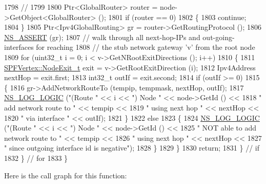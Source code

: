 \begin{DoxyCode}
1798 \textcolor{comment}{//}
1799 
1800           Ptr<GlobalRouter> router = node->GetObject<GlobalRouter> ();
1801           \textcolor{keywordflow}{if} (router == 0)
1802             \{
1803               \textcolor{keywordflow}{continue};
1804             \}
1805           Ptr<Ipv4GlobalRouting> gr = router->GetRoutingProtocol ();
1806           \hyperlink{assert_8h_a6dccdb0de9b252f60088ce281c49d052}{NS\_ASSERT} (gr);
1807           \textcolor{comment}{// walk through all next-hop-IPs and out-going-interfaces for reaching}
1808           \textcolor{comment}{// the stub network gateway 'v' from the root node}
1809           \textcolor{keywordflow}{for} (uint32\_t i = 0; i < v->GetNRootExitDirections (); i++)
1810             \{
1811               \hyperlink{classns3_1_1SPFVertex_a0adf6255ec0357050ef5436597b4cb32}{SPFVertex::NodeExit\_t} exit = v->GetRootExitDirection (i);
1812               Ipv4Address nextHop = exit.first;
1813               int32\_t outIf = exit.second;
1814               \textcolor{keywordflow}{if} (outIf >= 0)
1815                 \{
1816                   gr->AddNetworkRouteTo (tempip, tempmask, nextHop, outIf);
1817                   \hyperlink{group__logging_ga88acd260151caf2db9c0fc84997f45ce}{NS\_LOG\_LOGIC} (\textcolor{stringliteral}{"(Route "} << i << \textcolor{stringliteral}{") Node "} << node->GetId () <<
1818                                 \textcolor{stringliteral}{" add network route to "} << tempip <<
1819                                 \textcolor{stringliteral}{" using next hop "} << nextHop <<
1820                                 \textcolor{stringliteral}{" via interface "} << outIf);
1821                 \}
1822               \textcolor{keywordflow}{else}
1823                 \{
1824                   \hyperlink{group__logging_ga88acd260151caf2db9c0fc84997f45ce}{NS\_LOG\_LOGIC} (\textcolor{stringliteral}{"(Route "} << i << \textcolor{stringliteral}{") Node "} << node->GetId () <<
1825                                 \textcolor{stringliteral}{" NOT able to add network route to "} << tempip <<
1826                                 \textcolor{stringliteral}{" using next hop "} << nextHop <<
1827                                 \textcolor{stringliteral}{" since outgoing interface id is negative"});
1828                 \}
1829             \}
1830           \textcolor{keywordflow}{return};
1831         \} \textcolor{comment}{// if}
1832     \} \textcolor{comment}{// for}
1833 \}
\end{DoxyCode}


Here is the call graph for this function\+:





